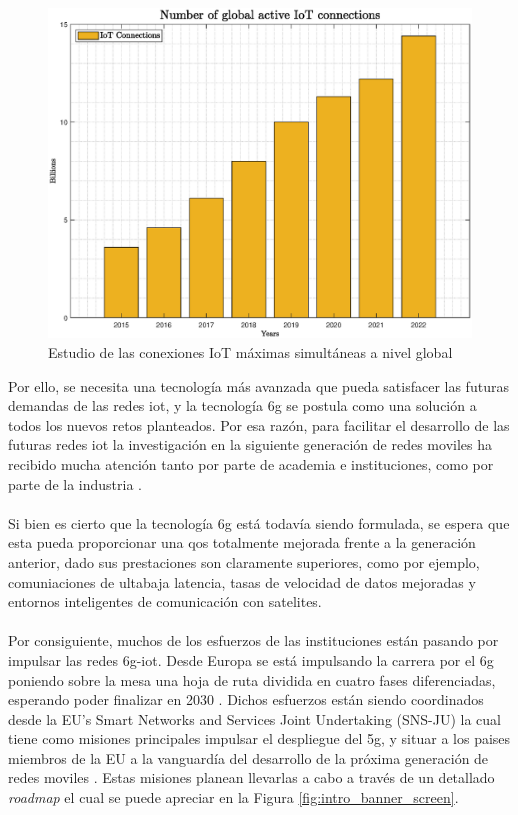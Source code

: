 \begin{figure}[ht]
    \centering
    \includegraphics[width=\textwidth]{archivos/img/intro/fig_iot.eps}
    \caption{Estudio de las conexiones IoT máximas simultáneas a nivel global \cite{figuraIoTDevices}}
    \label{fig:intro_fig_iot}
\end{figure}

Por ello, se necesita una tecnología más avanzada que pueda satisfacer las futuras demandas de las redes \gls{iot}, y la tecnología \gls{6g} se postula como una solución a todos los nuevos retos planteados. Por esa razón, para facilitar el desarrollo de las futuras redes \gls{iot} la investigación en la siguiente generación de redes moviles ha recibido mucha atención tanto por parte de academia e instituciones, como por parte de la industria \cite{Nguyen2022}. \\
\\
Si bien es cierto que la tecnología \gls{6g} está todavía siendo formulada, se espera que esta pueda proporcionar una \gls{qos} totalmente mejorada frente a la generación anterior, dado sus prestaciones son claramente superiores, como por ejemplo, comuniaciones de ultabaja latencia, tasas de velocidad de datos mejoradas y entornos inteligentes de comunicación con satelites. \\
\\
Por consiguiente, muchos de los esfuerzos de las instituciones están pasando por impulsar las redes \gls{6g}-\gls{iot}. Desde Europa se está impulsando la carrera por el \gls{6g} poniendo sobre la mesa una hoja de ruta dividida en cuatro fases diferenciadas, esperando poder finalizar en 2030 \cite{eu6GFases}. Dichos esfuerzos están siendo coordinados desde la EU’s Smart Networks and Services Joint Undertaking (SNS-JU) la cual tiene como misiones principales impulsar el despliegue del \gls{5g}, y situar a los paises miembros de la EU a la vanguardía del desarrollo de la próxima generación de redes moviles \cite{eu6gSNS}. Estas misiones planean llevarlas a cabo a través de un detallado \textit{roadmap} el cual se puede apreciar en la Figura \ref{fig:intro_banner_screen}.

